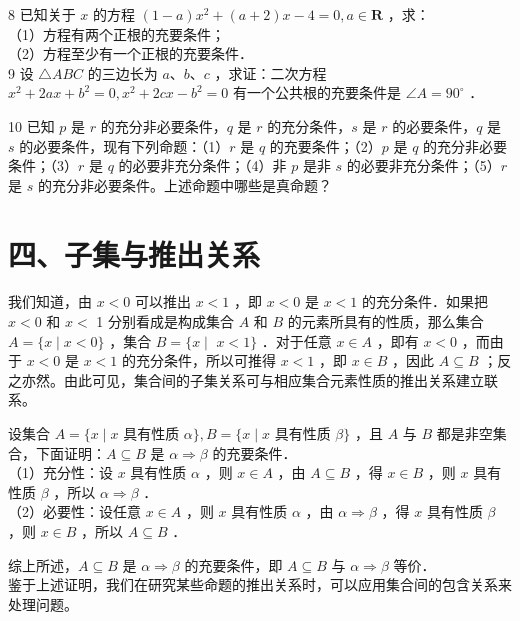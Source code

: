 \documentclass[10pt]{article}
\begin{document}
8 已知关于 \(x\) 的方程 \((1-a) x^{2}+(a+2) x-4=0, a \in \mathbf{R}\) ，求：\\
（1）方程有两个正根的充要条件；\\
（2）方程至少有一个正根的充要条件．\\
9 设 \(\triangle A B C\) 的三边长为 \(a 、 b 、 c\) ，求证：二次方程 \(x^{2}+2 a x+b^{2}=0, x^{2}+2 c x-b^{2}=0\) 有一个公共根的充要条件是 \(\angle A=90^{\circ}\) ．

10 已知 \(p\) 是 \(r\) 的充分非必要条件，\(q\) 是 \(r\) 的充分条件，\(s\) 是 \(r\) 的必要条件，\(q\) 是 \(s\) 的必要条件，现有下列命题：（1）\(r\) 是 \(q\) 的充要条件；（2）\(p\) 是 \(q\) 的充分非必要条件；（3）\(r\) 是 \(q\) 的必要非充分条件；（4）非 \(p\) 是非 \(s\) 的必要非充分条件；（5）\(r\) 是 \(s\) 的充分非必要条件。上述命题中哪些是真命题？

\section*{四、子集与推出关系}
我们知道，由 \(x<0\) 可以推出 \(x<1\) ，即 \(x<0\) 是 \(x<1\) 的充分条件．如果把 \(x<0\) 和 \(x<\) 1 分别看成是构成集合 \(A\) 和 \(B\) 的元素所具有的性质，那么集合 \(A=\{x \mid x<0\}\) ，集合 \(B=\{x \mid\) \(x<1\}\) ．对于任意 \(x \in A\) ，即有 \(x<0\) ，而由于 \(x<0\) 是 \(x<1\) 的充分条件，所以可推得 \(x<1\) ，即 \(x \in B\) ，因此 \(A \subseteq B\) ；反之亦然。由此可见，集合间的子集关系可与相应集合元素性质的推出关系建立联系。

设集合 \(A=\{x \mid x\) 具有性质 \(\alpha\}, B=\{x \mid x\) 具有性质 \(\beta\}\) ，且 \(A\) 与 \(B\) 都是非空集合，下面证明：\(A \subseteq B\) 是 \(\alpha \Rightarrow \beta\) 的充要条件．\\
（1）充分性：设 \(x\) 具有性质 \(\alpha\) ，则 \(x \in A\) ，由 \(A \subseteq B\) ，得 \(x \in B\) ，则 \(x\) 具有性质 \(\beta\) ，所以 \(\alpha \Rightarrow \beta\) ．\\
（2）必要性：设任意 \(x \in A\) ，则 \(x\) 具有性质 \(\alpha\) ，由 \(\alpha \Rightarrow \beta\) ，得 \(x\) 具有性质 \(\beta\) ，则 \(x \in B\) ，所以 \(A \subseteq B\) ．

综上所述，\(A \subseteq B\) 是 \(\alpha \Rightarrow \beta\) 的充要条件，即 \(A \subseteq B\) 与 \(\alpha \Rightarrow \beta\) 等价．\\
鉴于上述证明，我们在研究某些命题的推出关系时，可以应用集合间的包含关系来处理问题。
\end{document}
